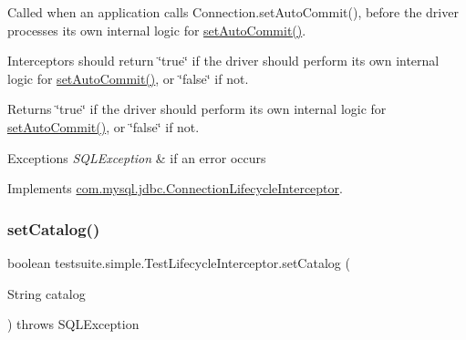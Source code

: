 Called when an application calls Connection.\+set\+Auto\+Commit(), before the driver processes its own internal logic for \mbox{\hyperlink{classtestsuite_1_1simple_1_1_test_lifecycle_interceptor_a98376ea207527feed3bc76d491c98cc2}{set\+Auto\+Commit()}}.

Interceptors should return \char`\"{}true\char`\"{} if the driver should perform its own internal logic for \mbox{\hyperlink{classtestsuite_1_1simple_1_1_test_lifecycle_interceptor_a98376ea207527feed3bc76d491c98cc2}{set\+Auto\+Commit()}}, or \char`\"{}false\char`\"{} if not.

\begin{DoxyReturn}{Returns}
\char`\"{}true\char`\"{} if the driver should perform its own internal logic for \mbox{\hyperlink{classtestsuite_1_1simple_1_1_test_lifecycle_interceptor_a98376ea207527feed3bc76d491c98cc2}{set\+Auto\+Commit()}}, or \char`\"{}false\char`\"{} if not.
\end{DoxyReturn}

\begin{DoxyExceptions}{Exceptions}
{\em S\+Q\+L\+Exception} & if an error occurs \\
\hline
\end{DoxyExceptions}


Implements \mbox{\hyperlink{interfacecom_1_1mysql_1_1jdbc_1_1_connection_lifecycle_interceptor_af86c9f877791fe2dded81722568863b7}{com.\+mysql.\+jdbc.\+Connection\+Lifecycle\+Interceptor}}.

\mbox{\label{classtestsuite_1_1simple_1_1_test_lifecycle_interceptor_accae42bd1b1d7a51fa35a6f375bf4ce4}} 
\subsubsection{\texorpdfstring{set\+Catalog()}{setCatalog()}}
{\footnotesize\ttfamily boolean testsuite.\+simple.\+Test\+Lifecycle\+Interceptor.\+set\+Catalog (\begin{DoxyParamCaption}\item[{String}]{catalog }\end{DoxyParamCaption}) throws S\+Q\+L\+Exception}

